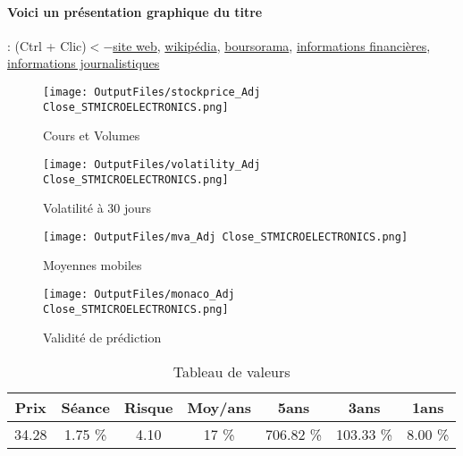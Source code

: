 \documentclass[11pt,a4paper]{report}%
\begin{document}
\paragraph{Voici un présentation graphique du titre} : (Ctrl + Clic)$<-$\href{https://investors.st.com/}{site web}, \href{https://fr.wikipedia.org/wiki/STMicroelectronics}{wikipédia}, \href{https://www.boursorama.com/cours/1rPSTM}{boursorama}, \href{https://www.qwant.com/?q=site:https:%2f%2fwww.easybourse.com%2faction-societe%2fSTMICROELECTRONICS&t=web&client=ext-firefox-hp}{informations financières}, \href{https://bourse.lerevenu.com/cours-de-bourse/fiche-valeur-synthese/STMICROELECTRONICS/STM-FR}{informations journalistiques}
\begin{figure}[!htb]
   \begin{minipage}{0.5\textwidth}
     \centering
     \texttt{[image: OutputFiles/stockprice\_Adj Close\_STMICROELECTRONICS.png]}
     \caption{Cours et Volumes}\label{Fig:price_STMICROELECTRONICS}
   \end{minipage}\hfill
   \begin{minipage}{0.5\textwidth}
     \centering
     \texttt{[image: OutputFiles/volatility\_Adj Close\_STMICROELECTRONICS.png]}
     \caption{Volatilité à 30 jours}\label{Fig:volat_STMICROELECTRONICS}
   \end{minipage}
\end{figure}
\begin{figure}[!htb]
   \begin{minipage}{0.5\textwidth}
     \centering
     \texttt{[image: OutputFiles/mva\_Adj Close\_STMICROELECTRONICS.png]}
     \caption{Moyennes mobiles}\label{Fig:mva_STMICROELECTRONICS}
   \end{minipage}\hfill
   \begin{minipage}{0.5\textwidth}
     \centering
     \texttt{[image: OutputFiles/monaco\_Adj Close\_STMICROELECTRONICS.png]}
     \caption{Validité de prédiction}\label{Fig:prediction_STMICROELECTRONICS}
   \end{minipage}
\end{figure}

\begin{table}[H]
  \centering
    \begin{tabular}{|c|c|c|c|c|c|c|}
    \hline
    Prix & Séance & Risque  & Moy/ans & 5ans & 3ans & 1ans \\
    \hline
    34.28 &    1.75 \%    & 4.10 & 17 \% & 706.82 \% & 103.33 \% & 8.00 \% \\
    \hline
    \end{tabular}%
        \label{tab:table_STMICROELECTRONICS}%
      \caption{Tableau de valeurs}
\end{table}%
\end{document}
